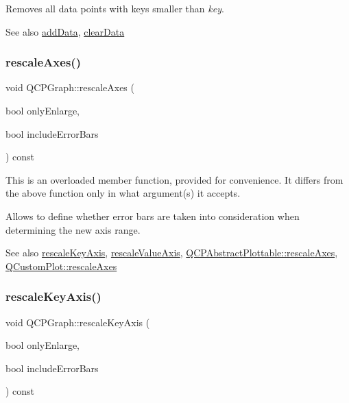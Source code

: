 Removes all data points with keys smaller than {\itshape key}. \begin{DoxySeeAlso}{See also}
\hyperlink{class_q_c_p_graph_aa5c6181d84db72ce4dbe9dc15a34ef4f}{add\+Data}, \hyperlink{class_q_c_p_graph_ad4e94a4e44e5e76fbec81a72a977157d}{clear\+Data} 
\end{DoxySeeAlso}
\hypertarget{class_q_c_p_graph_a9c3909d6116e9d03978f057d41174e6a}{}\label{class_q_c_p_graph_a9c3909d6116e9d03978f057d41174e6a} 
\subsubsection{\texorpdfstring{rescale\+Axes()}{rescaleAxes()}}
{\footnotesize\ttfamily void Q\+C\+P\+Graph\+::rescale\+Axes (\begin{DoxyParamCaption}\item[{bool}]{only\+Enlarge,  }\item[{bool}]{include\+Error\+Bars }\end{DoxyParamCaption}) const}

This is an overloaded member function, provided for convenience. It differs from the above function only in what argument(s) it accepts.

Allows to define whether error bars are taken into consideration when determining the new axis range.

\begin{DoxySeeAlso}{See also}
\hyperlink{class_q_c_p_graph_a051fb77b459ba1ae8d65552c67f45e94}{rescale\+Key\+Axis}, \hyperlink{class_q_c_p_graph_a9e0e620a56932c4df80a3762c2f93608}{rescale\+Value\+Axis}, \hyperlink{class_q_c_p_abstract_plottable_a1491c4a606bccd2d09e65e11b79eb882}{Q\+C\+P\+Abstract\+Plottable\+::rescale\+Axes}, \hyperlink{class_q_custom_plot_ad86528f2cee6c7e446dea4a6e8839935}{Q\+Custom\+Plot\+::rescale\+Axes} 
\end{DoxySeeAlso}
\hypertarget{class_q_c_p_graph_a051fb77b459ba1ae8d65552c67f45e94}{}\label{class_q_c_p_graph_a051fb77b459ba1ae8d65552c67f45e94} 
\subsubsection{\texorpdfstring{rescale\+Key\+Axis()}{rescaleKeyAxis()}}
{\footnotesize\ttfamily void Q\+C\+P\+Graph\+::rescale\+Key\+Axis (\begin{DoxyParamCaption}\item[{bool}]{only\+Enlarge,  }\item[{bool}]{include\+Error\+Bars }\end{DoxyParamCaption}) const}

